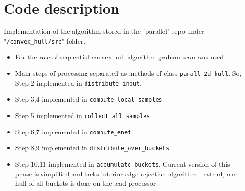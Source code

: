 \documentclass[a4paper]{article}
\begin{document}
\section {Code description}
     Implementation of the algorithm stored in the "parallel" repo under "\verb|/convex_hull/src|" folder.
     \begin {itemize}
         \item For the role of sequential convex hull algorithm graham scan was used
         \item Main steps of processing separated as methods of class \verb|parall_2d_hull|. So, Step 2 implemented in \verb|distribute_input|. 
         \item Step 3,4 implemented in \verb|compute_local_samples|
         \item Step 5 implemented in \verb|collect_all_samples|
         \item Step 6,7 implemented in \verb|compute_enet|
         \item Step 8,9 implemented in \verb|distribute_over_buckets|
         \item Step 10,11  implemented in \verb|accumulate_buckets|. Current version of this phase is simplified and lacks interior-edge rejection algorithm. Instead, one hull of all buckets is done on the lead processor
     \end {itemize}
\end{document}
